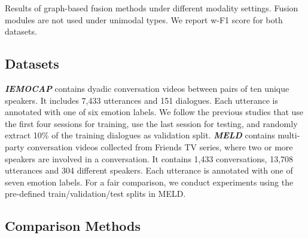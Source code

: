 \documentclass{article}
\begin{document}
\begin{table}[t]
\centering
\resizebox{1.0\linewidth}{!}{}
\caption{Results of graph-based fusion methods under different modality settings. 
Fusion modules are not used under unimodal types.
We report w-F1 score for both datasets.
} \label{tab:modality}
\end{table}







\subsection{Datasets}
\textit{\textbf{IEMOCAP}} \cite{DBLP:journals/lre/BussoBLKMKCLN08} 
contains dyadic conversation videos between pairs of ten unique speakers. 
It includes 7,433 utterances and 151 dialogues. Each utterance is annotated with one of six emotion labels.
We follow the previous studies \cite{DBLP:conf/emnlp/GhosalMPCG19,DBLP:conf/acl/HuLZJ20} that use the first four sessions for training, use the last session for testing, and randomly extract 10\% of the training dialogues as validation split.
\textit{\textbf{MELD}}
\cite{DBLP:conf/acl/PoriaHMNCM19} 
contains multi-party conversation videos collected from Friends TV series, where two or more speakers are involved in a conversation. 
It contains 1,433 conversations, 13,708 utterances and 304 different speakers. Each utterance is annotated with one of seven emotion labels.
For a fair comparison, we conduct experiments using the pre-defined train/validation/test splits in MELD.









\subsection{Comparison Methods}
\end{document}

